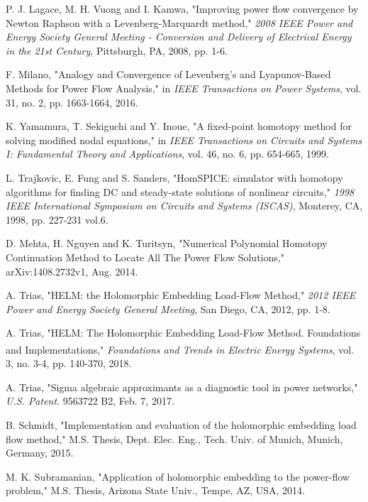 \documentclass[journal]{IEEEtran}
\begin{document}
\begin{thebibliography}{31}
P. J. Lagace, M. H. Vuong and I. Kamwa, "Improving power flow convergence by Newton Raphson with a Levenberg-Marquardt method," \emph{2008 IEEE Power and Energy Society General Meeting - Conversion and Delivery of Electrical Energy in the 21st Century}, Pittsburgh, PA, 2008, pp. 1-6.

F. Milano, "Analogy and Convergence of Levenberg's and Lyapunov-Based Methods for Power Flow Analysis," in \emph{IEEE Transactions on Power Systems}, vol. 31, no. 2, pp. 1663-1664, 2016.

K. Yamamura, T. Sekiguchi and Y. Inoue, "A fixed-point homotopy method for solving modified nodal equations," in \emph{IEEE Transactions on Circuits and Systems I: Fundamental Theory and Applications}, vol. 46, no. 6, pp. 654-665, 1999.

L. Trajkovic, E. Fung and S. Sanders, "HomSPICE: simulator with homotopy algorithms for finding DC and steady-state solutions of nonlinear circuits," \emph{1998 IEEE International Symposium on Circuits and Systems (ISCAS)}, Monterey, CA, 1998, pp. 227-231 vol.6.

D. Mehta, H. Nguyen and K. Turitsyn, "Numerical Polynomial Homotopy Continuation Method to Locate All The Power Flow Solutions," arXiv:1408.2732v1, Aug. 2014.

A. Trias, "HELM: the Holomorphic Embedding Load-Flow Method," \emph{2012 IEEE Power and Energy Society General Meeting}, San Diego, CA, 2012, pp. 1-8.

A. Trias, "HELM: The Holomorphic Embedding Load-Flow Method. Foundations and Implementations," \emph{Foundations and Trends\textsuperscript{\textregistered} in Electric Energy Systems}, vol. 3, no. 3-4, pp. 140-370, 2018.

A. Trias, "Sigma algebraic approximants as a diagnostic tool in power networks," \emph{U.S. Patent}. 9563722 B2, Feb. 7, 2017.

B. Schmidt, "Implementation and evaluation of the holomorphic embedding load flow method," M.S. Thesis, Dept. Elec. Eng., Tech. Univ. of Munich, Munich, Germany, 2015.

M. K. Subramanian, "Application of holomorphic embedding to the power-flow problem," M.S. Thesis, Arizona State Univ., Tempe, AZ, USA, 2014.



\end{thebibliography}
\end{document}
